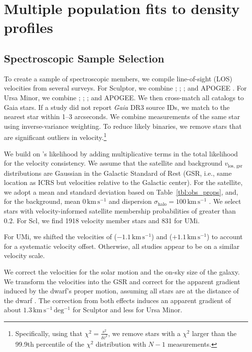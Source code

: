 \documentclass[times,trackchanges, twocolumn, twocolappendix]{aastex701}
\newcommand{\kms}{\mathrm{km\,s^{-1}}}
\newcommand{\jj}{\citetalias{jensen+2024}}
\begin{document}
\section{Multiple population fits to density profiles}
\label{sec:double_exp_fits}

\subsection{Spectroscopic Sample Selection} 
To create a sample of spectroscopic members, we compile line-of-sight (LOS) velocities from
several surveys. For
Sculptor, we combine \citet{tolstoy+2023}; \citet{walker+2009};
\citet{sestito+2023a}; and APOGEE \citep[DR17,][]{abdurrouf+2022}. For
Ursa Minor, we combine \citet{spencer+2018}; \citet{pace+2020};
\citet{sestito+2023b}; and APOGEE. We then cross-match all catalogs to
\jj{} Gaia stars. If a study did not report \textit{Gaia} DR3 source IDs,
we match to the nearest star within 1--3 arcseconds. We combine
measurements of the same star using inverse-variance weighting. To
reduce likely binaries, we remove stars that are significant outliers in velocity.\footnote{Specifically, using that
  $\chi^2=\frac{s^2}{\delta \bar v^2}$, we remove stars with a
  $\chi^2$ larger than the 99.9th percentile of the $\chi^2$
  distribution with $N-1$ measurements.}

We build on \jj{}'s likelihood by adding multiplicative terms in the
total likelihood for the velocity consistency. We assume that the satellite and
background $v_\text{los, gsr}$ distributions are Gaussian in the
Galactic Standard of Rest (GSR, i.e., same location as ICRS but
velocities relative to the Galactic center). For the satellite, we adopt
a mean and standard deviation based on
Table~\ref{tbl:obs_props}, and, for the
background, mean $0\,\kms$ and dispersion
$\sigma_\text{halo} = 100\,\kms$ \citep[e.g.][]{brown+2010}. We select
stars with velocity-informed satellite membership probabilities of
greater than 0.2. For Scl, we find 1918 velocity member stars and 831 for UMi.

For UMi, we shifted the velocities of \citet{spencer+2018}
($-1.1\,\kms$) and \citet{pace+2020} ($+1.1\,\kms$) to account for
a systematic velocity offset. Otherwise, all studies appear to be on a
similar velocity scale.

We correct the velocities for the solar motion and the on-sky size of
the galaxy. We transform the velocities into the GSR and correct for the
apparent gradient induced by the dwarf's proper motion, assuming all stars are at the distance of the dwarf \citep[see,][]{WMO2008, strigari2010}. The
correction from both effects induces an apparent gradient of about
$1.3\,\mathrm{km\,s^{-1}\,deg^{-1}}$ for Sculptor and less for Ursa Minor. 
\end{document}
